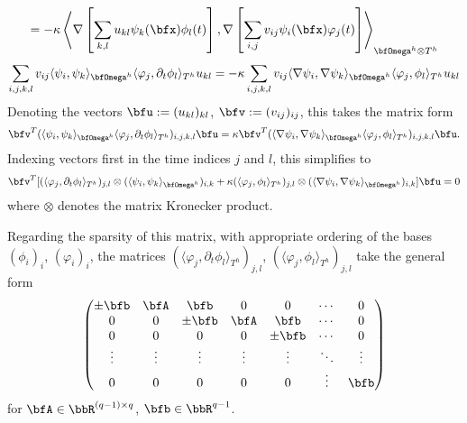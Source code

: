 \begin{example}
\begin{multline}
            =  - \kappa\left\langle\nabla\left[\sum_{k, l}u_{kl}\psi_{k}(\bfx)\phi_{l}(t)\right], \nabla\left[\sum_{i, j}v_{ij}\psi_{i}(\bfx)\varphi_{j}(t)\right]\right\rangle_{\bfOmega^{h}\otimes T^{h}}
        \end{multline}
        \begin{equation}
            \sum_{i, j, k, l}v_{ij}\langle\psi_{i}, \psi_{k}\rangle_{\bfOmega^{h}}\langle\varphi_{j}, \partial_{t}\phi_{l}\rangle_{T^{h}}u_{kl}  =  - \kappa\sum_{i, j, k, l}v_{ij}\langle\nabla\psi_{i}, \nabla\psi_{k}\rangle_{\bfOmega^{h}}\langle\varphi_{j}, \phi_{l}\rangle_{T^{h}}u_{kl}
        \end{equation}
        Denoting the vectors $\bfu  :=  (u_{kl})_{kl}$, $\bfv  :=  (v_{ij})_{ij}$, this takes the matrix form
        \begin{equation}
            \bfv^{T}(\langle\psi_{i}, \psi_{k}\rangle_{\bfOmega^{h}}\langle\varphi_{j}, \partial_{t}\phi_{l}\rangle_{T^{h}})_{i, j, k, l}\bfu  =  \kappa\bfv^{T}(\langle\nabla\psi_{i}, \nabla\psi_{k}\rangle_{\bfOmega^{h}}\langle\varphi_{j}, \phi_{l}\rangle_{T^{h}})_{i, j, k, l}\bfu.
        \end{equation}
        Indexing vectors first in the time indices $j$ and $l$, this simplifies to
        \begin{equation}
            \bfv^{T}[(\langle\varphi_{j}, \partial_{t}\phi_{l}\rangle_{T^{h}})_{j, l}\otimes(\langle\psi_{i}, \psi_{k}\rangle_{\bfOmega^{h}})_{i, k} + \kappa(\langle\varphi_{j}, \phi_{l}\rangle_{T^{h}})_{j, l}\otimes(\langle\nabla\psi_{i}, \nabla\psi_{k}\rangle_{\bfOmega^{h}})_{i, k}]\bfu  =  0
        \end{equation}
        where $\otimes$ denotes the matrix Kronecker product.
        
        Regarding the sparsity of this matrix, with appropriate ordering of the bases $(\phi_{i})_{i}$, $(\varphi_{i})_{i}$, the matrices $(\langle\varphi_{j}, \partial_{t}\phi_{l}\rangle_{T^{h}})_{j, l}$, $(\langle\varphi_{j}, \phi_{l}\rangle_{T^{h}})_{j, l}$ take the general form
        \begin{equation}
          \begin{pmatrix}
            \pm\bfb  &  \bfA    &  \bfb     &  0       &  0        &  \cdots   &  0        \\
            0        &  0       &  \pm\bfb  &  \bfA    &  \bfb     &  \cdots   &  0        \\
            0        &  0       &  0        &  0       &  \pm\bfb  &  \cdots   &  0        \\
            \vdots   &  \vdots  &  \vdots   &  \vdots  &  \vdots   &  \ddots   &  \vdots   \\
            0        &  0       &  0        &  0       &  0        &  \vdots   &  \bfb     \\
            \end{pmatrix}
        \end{equation}
        for $\bfA  \in  \bbR^{(q - 1)\times q}$, $\bfb  \in  \bbR^{q - 1}$.
    \end{example}
    \line

    
